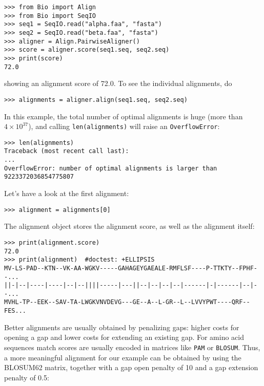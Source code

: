 \begin{verbatim}
>>> from Bio import Align
>>> from Bio import SeqIO
>>> seq1 = SeqIO.read("alpha.faa", "fasta")
>>> seq2 = SeqIO.read("beta.faa", "fasta")
>>> aligner = Align.PairwiseAligner()
>>> score = aligner.score(seq1.seq, seq2.seq)
>>> print(score)
72.0
\end{verbatim}

showing an alignment score of 72.0. To see the individual alignments, do

\begin{verbatim}
>>> alignments = aligner.align(seq1.seq, seq2.seq)
\end{verbatim}
In this example, the total number of optimal alignments is huge (more than $4 \times 10^{37}$), and calling \verb+len(alignments)+ will raise an \verb+OverflowError+:

\begin{verbatim}
>>> len(alignments)
Traceback (most recent call last):
...
OverflowError: number of optimal alignments is larger than 9223372036854775807
\end{verbatim}
Let's have a look at the first alignment:

\begin{verbatim}
>>> alignment = alignments[0]
\end{verbatim}

The alignment object stores the alignment score, as well as the alignment
itself:

\begin{verbatim}
>>> print(alignment.score)
72.0
>>> print(alignment)  #doctest: +ELLIPSIS
MV-LS-PAD--KTN--VK-AA-WGKV-----GAHAGEYGAEALE-RMFLSF----P-TTKTY--FPHF--...
||-|--|----|----|--|--||||-----|---||--|--|--|--|------|-|------|--|--...
MVHL-TP--EEK--SAV-TA-LWGKVNVDEVG---GE--A--L-GR--L--LVVYPWT----QRF--FES...
\end{verbatim}

Better alignments are usually obtained by penalizing gaps: higher costs
for opening a gap and lower costs for extending an existing gap. For amino
acid sequences match scores are usually encoded in matrices like \texttt{PAM}
or \texttt{BLOSUM}. Thus, a more meaningful alignment for our example can be
obtained by using the BLOSUM62 matrix, together with a gap open penalty of 10
and a gap extension penalty of 0.5:

